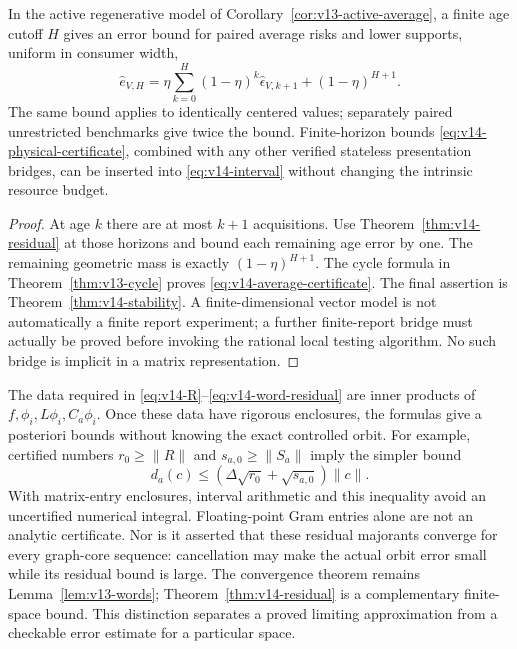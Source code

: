 \begin{corollary}
\label{cor:v14-average-certificate}
In the active regenerative model of
Corollary~\ref{cor:v13-active-average}, a finite age cutoff $H$ gives
an error bound for paired average risks and lower supports, uniform
in consumer width,
\begin{equation}\label{eq:v14-average-certificate}
 \widehat e_{V,H}=
 \eta\sum_{k=0}^{H}(1-\eta)^k\widehat\epsilon_{V,k+1}
          +(1-\eta)^{H+1}.
\end{equation}
The same bound applies to identically centered values; separately
paired unrestricted benchmarks give twice the bound. Finite-horizon
bounds \eqref{eq:v14-physical-certificate}, combined with any other
verified stateless presentation bridges, can be inserted into
\eqref{eq:v14-interval} without changing the intrinsic resource budget.
\end{corollary}
\begin{proof}
At age $k$ there are at most $k+1$ acquisitions. Use
Theorem~\ref{thm:v14-residual} at those horizons and bound each remaining
age error by one. The remaining geometric mass is exactly
$(1-\eta)^{H+1}$. The cycle formula in
Theorem~\ref{thm:v13-cycle} proves \eqref{eq:v14-average-certificate}.
The final assertion is Theorem~\ref{thm:v14-stability}. A finite-dimensional
vector model is not automatically a finite report experiment; a further
finite-report bridge must actually be proved before invoking the
rational local testing algorithm. No such bridge is implicit in a
matrix representation.
\end{proof}

The data required in \eqref{eq:v14-R}--\eqref{eq:v14-word-residual} are
inner products of $f,\phi_i,L\phi_i,C_a\phi_i$. Once these data have
rigorous enclosures, the formulas give a posteriori bounds without
knowing the exact controlled orbit. For example, certified numbers
$r_0\ge\|R\|$ and $s_{a,0}\ge\|S_a\|$ imply the simpler bound
\[
 d_a(c)\le(\Delta\sqrt{r_0}+\sqrt{s_{a,0}})\|c\|.
\]
With matrix-entry enclosures, interval arithmetic and this inequality
avoid an uncertified numerical integral. Floating-point Gram entries
alone are not an analytic certificate. Nor is it asserted that these
residual majorants converge for every graph-core sequence: cancellation
may make the actual orbit error small while its residual bound is
large. The convergence theorem remains Lemma~\ref{lem:v13-words};
Theorem~\ref{thm:v14-residual} is a complementary finite-space bound.
This distinction separates a proved limiting approximation from a
checkable error estimate for a particular space.
